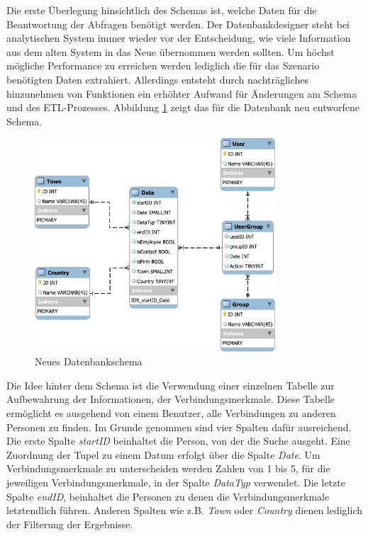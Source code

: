 Die erste Überlegung hinsichtlich des Schemas ist, welche Daten für die Beantwortung der Abfragen benötigt werden. Der Datenbankdesigner steht bei analytischen System immer wieder vor der Entscheidung, wie viele Information aus dem alten System in das Neue übernommen werden sollten. Um höchst mögliche Performance zu erreichen werden lediglich die für das Szenario benötigten Daten extrahiert. Allerdings entsteht durch nachträgliches hinzunehmen von Funktionen ein erhöhter Aufwand für Änderungen am Schema und des ETL-Prozesses. Abbildung \ref{konzept_SchemaNeu} zeigt das für die Datenbank neu entworfene Schema. 

\begin{figure}[htbp]
\centering
  \includegraphics[width=0.8\textwidth, width=0.8\textwidth]{pics/NewSchema.pdf}
\caption{Neues Datenbankschema}
\label{konzept_SchemaNeu}
\end{figure} 

Die Idee hinter dem Schema ist die Verwendung einer einzelnen Tabelle zur Aufbewahrung der Informationen, der Verbindungsmerkmale. Diese Tabelle ermöglicht es ausgehend von einem Benutzer, alle Verbindungen zu anderen Personen zu finden. Im Grunde genommen sind vier Spalten dafür ausreichend. Die erste Spalte \textit{startID} beinhaltet die Person, von der die Suche ausgeht. Eine Zuordnung der Tupel zu einem Datum erfolgt über die Spalte \textit{Date}. Um Verbindungsmerkmale zu unterscheiden werden Zahlen von 1 bis 5, für die jeweiligen Verbindungsmerkmale, in der Spalte \textit{DataTyp} verwendet. Die letzte Spalte \textit{endID}, beinhaltet die Personen zu denen die Verbindungsmerkmale letztendlich führen. Anderen Spalten wie z.B. \textit{Town} oder \textit{Country} dienen lediglich der Filterung der Ergebnisse.

